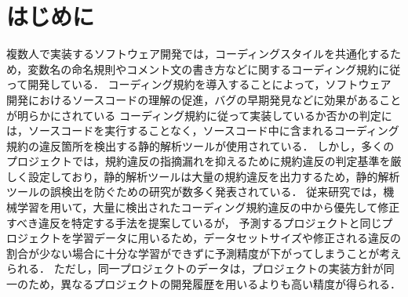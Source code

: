 \documentclass[twocolumn]{jarticle} %
\begin{document}
\maketitle
\thispagestyle{empty} %



\section{はじめに}

複数人で実装するソフトウェア開発では，コーディングスタイルを共通化するため，変数名の命名規則やコメント文の書き方などに関するコーディング規約に従って開発している．
コーディング規約を導入することによって，ソフトウェア開発におけるソースコードの理解の促進，バグの早期発見などに効果があることが明らかにされている\cite{Beller2}
コーディング規約に従って実装しているか否かの判定には，ソースコードを実行することなく，ソースコード中に含まれるコーディング規約の違反箇所を検出する静的解析ツールが使用されている．
しかし，多くのプロジェクトでは，規約違反の指摘漏れを抑えるために規約違反の判定基準を厳しく設定しており，静的解析ツールは大量の規約違反を出力するため，静的解析ツールの誤検出を防ぐための研究が数多く発表されている\cite{Nguyen}．
従来研究では，機械学習を用いて，大量に検出されたコーディング規約違反の中から優先して修正すべき違反を特定する手法を提案しているが，
予測するプロジェクトと同じプロジェクトを学習データに用いるため，データセットサイズや修正される違反の割合が少ない場合に十分な学習ができずに予測精度が下がってしまうことが考えられる\cite{JyuraiPre}．
ただし，同一プロジェクトのデータは，プロジェクトの実装方針が同一のため，異なるプロジェクトの開発履歴を用いるよりも高い精度が得られる．
\end{document}
